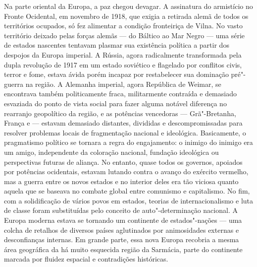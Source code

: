 \begin{epigraphs} 
\end{epigraphs}

Na parte oriental da Europa, a paz chegou devagar. A assinatura do
armistício no Fronte Ocidental, em novembro de 1918, que exigia a
retirada alemã de todos os territórios ocupados, só fez alimentar a
condição fronteiriça de Vilna. No vasto território deixado pelas forças
alemãs --- do Báltico ao Mar Negro --- uma série de estados nascentes
tentavam plasmar sua existência política a partir dos despojos da Europa
imperial. A Rússia, agora radicalmente transformada pela dupla revolução
de 1917 em um estado soviético e flagelado por conflitos civis, terror e
fome, estava ávida porém incapaz por restabelecer sua dominação
pré"-guerra na região. A Alemanha imperial, agora República de Weimar, se
encontrava também politicamente fraca, militarmente contraída e
demasiado esvaziada do ponto de vista social para fazer alguma notável
diferença no rearranjo geopolítico da região, e as potências vencedoras
--- Grã"-Bretanha, França e  --- estavam demasiado distantes, divididas e
descompromissadas para resolver problemas locais de fragmentação
nacional e ideológica. Basicamente, o pragmatismo político se tornara a
regra do engajamento: o inimigo do inimigo era um amigo, independente da
coloração nacional, fundação ideológica ou perspectivas futuras de
aliança. No entanto, quase todos os governos, apoiados por potências
ocidentais, estavam lutando contra o avanço do exército vermelho, mas a
guerra entre os novos estados e no interior deles era tão viciosa quanto
aquela que se baseava no combate global entre comunismo e capitalismo.
No fim, com a solidificação de vários povos em estados, teorias de
internacionalismo e luta de classe foram substituídas pelo conceito de
auto"-determinação nacional. A Europa moderna estava se tornando um
continente de estados"-nações --- uma colcha de retalhos de diversos países
aglutinados por animosidades externas e desconfianças internas. Em
grande parte, essa nova Europa recobria a mesma área geográfica da há
muito esquecida região da Sarmácia, parte do continente marcada por
fluidez espacial e contradições históricas.

